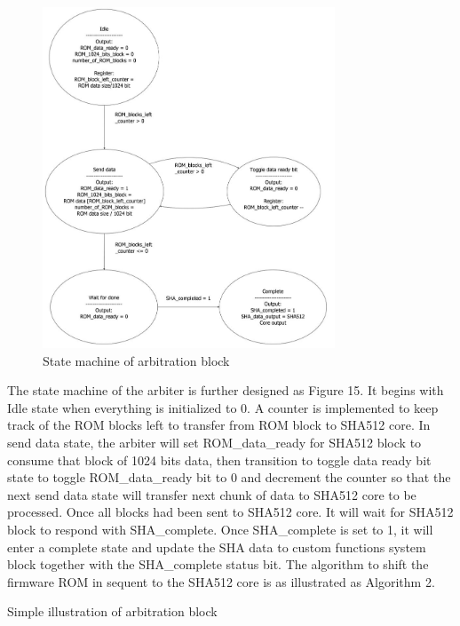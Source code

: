 \documentclass[a4paper,fleqn]{cas-dc}
\begin{document}
\begin{figure}[hbt!]
	\centering
	\includegraphics[height=4in]{figs/StateMachine.JPG}
	\caption{State machine of arbitration block}
\end{figure}


The state machine of the arbiter is further designed as Figure 15. It begins with Idle state when everything is initialized to 0. A counter is implemented to keep track of the ROM blocks left to transfer from ROM block to SHA512 core. In send data state, the arbiter will set ROM\_data\_ready for SHA512 block to consume that block of 1024 bits data, then transition to toggle data ready bit state to toggle ROM\_data\_ready bit to 0 and decrement the counter so that the next send data state will transfer next chunk of data to SHA512 core to be processed. Once all blocks had been sent to SHA512 core. It will wait for SHA512 block to respond with SHA\_complete. Once SHA\_complete is set to 1, it will enter a complete state and update the SHA data to custom functions system block together with the SHA\_complete status bit. The algorithm to shift the firmware ROM in sequent to the SHA512 core is as illustrated as Algorithm 2.

\begin{algorithm}
 \caption{Simple illustration of arbitration block}

\end{algorithm}
\end{document}
